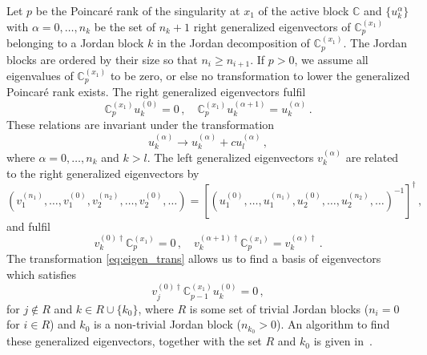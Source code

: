 \documentclass[12pt]{article}
\numberwithin{equation}{section}
\numberwithin{figure}{section}
\newcommand{\C}{\mathds{C}}
\begin{document}
        Let $p$ be the Poincar\'{e} rank of the singularity at $x_1$ of the active block $\C$ and $\{u_k^{\alpha}\}$ with $\alpha = 0,\dots,n_k$ be the set of $n_k+1$ right generalized eigenvectors of $\C_p^{(x_1)}$ belonging to a Jordan block $k$ in the Jordan decomposition of $\C_p^{(x_1)}$.
        The Jordan blocks are ordered by their size so that $n_i \geq n_{i+1}$.
        If $p>0$, we assume all eigenvalues of $\C_p^{(x_1)}$ to be zero, or else no transformation to lower the generalized Poincar\'{e} rank exists.
        The right generalized eigenvectors fulfil
        \[
          \C_p^{(x_1)} u_k^{(0)} = 0\,, \quad
          \C_p^{(x_1)} u_k^{(\alpha+1)} = u_k^{(\alpha)}\,.
        \]
        These relations are invariant under the transformation
        \begin{equation} \label{eq:eigen_trans}
          u_k^{(\alpha)} \rightarrow u_k^{(\alpha)} + cu_l^{(\alpha)}\,,
        \end{equation}
        where $\alpha=0,\dots,n_k$ and $k>l$.
        The left generalized eigenvectors $v_k^{(\alpha)}$ are related to the right generalized eigenvectors by
        \begin{equation} \label{eq:left_eigen}
          \left(
            v_1^{(n_1)},\dots,v_1^{(0)},
            v_2^{(n_2)},\dots,v_2^{(0)},
            \dots
          \right)
          =
          \left[
            \left(
              u_1^{(0)},\dots,u_1^{(n_1)},
              u_2^{(0)},\dots,u_2^{(n_2)},
              \dots
            \right)^{-1}
          \right]^\dagger\,,
        \end{equation}
        and fulfil
        \[
          v_k^{(0)\dagger} \C_p^{(x_1)} = 0\,, \quad
          v_k^{(\alpha+1)\dagger} \C_p^{(x_1)} = v_k^{(\alpha)\dagger}\,.
        \]
        The transformation \eqref{eq:eigen_trans} allows us to find a basis of eigenvectors which satisfies
        \begin{equation} \label{eq:eigen_cond}
          v_j^{(0)\dagger} \C_{p-1}^{(x_1)} u_k^{(0)} = 0\,,
        \end{equation}
        for $j \notin R$ and $k \in R \cup \{k_0\}$, where $R$ is some set of trivial Jordan blocks ($n_i = 0$ for $i\in R$) and $k_0$ is a non-trivial Jordan block ($n_{k_0} > 0$).
        An algorithm to find these generalized eigenvectors, together with the set $R$ and $k_0$ is given in~\cite{Lee:2014ioa}.
\end{document}
